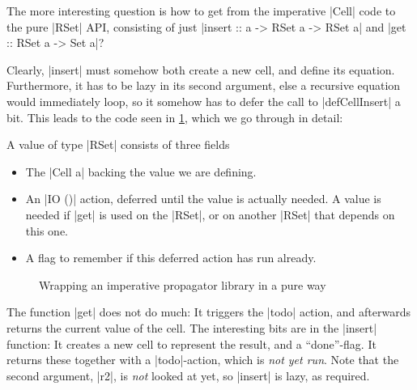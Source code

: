 \documentclass[manuscript,review,screen,acmsmall]{acmart}
\begin{document}
The more interesting question is how to get from the imperative |Cell| code to the pure |RSet| API, consisting of just |insert :: a -> RSet a -> RSet a| and |get :: RSet a -> Set a|?

Clearly, |insert| must somehow both create a new cell, and define its equation.
Furthermore, it has to be lazy in its second argument, else a recursive equation would immediately loop, so it somehow has to defer the call to |defCellInsert| a bit. This leads to the code seen in \cref{fig:wrap}, which we go through in detail:

A value of type |RSet| consists of three fields
\begin{itemize}
\item The |Cell a| backing the value we are defining.
\item An |IO ()| action, deferred until the value is actually needed. A value is needed if |get| is used on the |RSet|, or on another |RSet| that depends on this one.
\item A flag to remember if this deferred action has run already.
\end{itemize}


\begin{figure}%
\setlength{\abovedisplayskip}{0pt}%
\setlength{\belowdisplayskip}{0pt}%
\raggedright%
%
\caption{Wrapping an imperative propagator library in a pure way}\label{fig:wrap}
\end{figure}

The function |get| does not do much: It triggers the |todo| action, and afterwards returns the current value of the cell. The interesting bits are in the |insert| function: It creates a new cell to represent the result, and a “done”-flag. It returns these together with a |todo|-action, which is \emph{not yet run}. Note that the second argument, |r2|, is \emph{not} looked at yet, so |insert| is lazy, as required.
\end{document}
